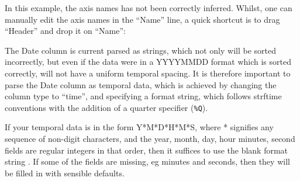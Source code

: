 \begin{center}
\end{center}

In this example, the axis names has not been correctly
inferred. Whilst, one can manually edit the axis names in the ``Name''
line, a quick shortcut is to drag ``Header'' and drop it on ``Name'':

The Date column is current parsed as strings, which not only will be
sorted incorrectly, but even if the data were in a YYYYMMDD format
which is sorted correctly, will not have a uniform temporal
spacing. It is therefore important to parse the Date column as
temporal data, which is achieved by changing the column type to
``time'', and specifying a format string, which follows strftime
conventions with the addition of a quarter specifier (\verb+%Q+).
\label{strftime format specifier}

If your temporal data is in the form Y*M*D*H*M*S, where * signifies
any sequence of non-digit characters, and the year, month, day, hour
minutes, second fields are regular integers in that order, then it
suffices to use the blank format string . If some of the fields are missing, eg minutes and seconds,
then they will be filled in with sensible defaults.

\begin{center}
\end{center}

